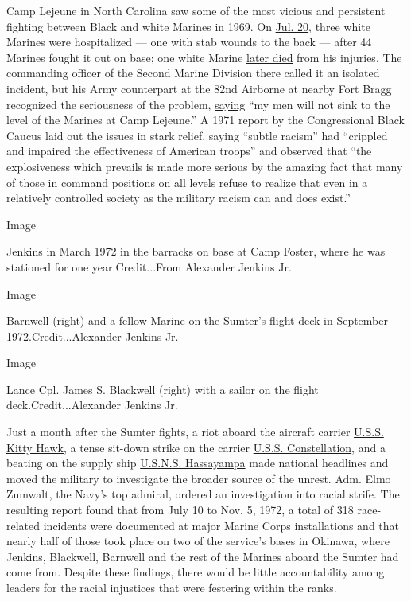 Camp Lejeune in North Carolina saw some of the most vicious and
persistent fighting between Black and white Marines in 1969. On
\href{https://www.nytimes3xbfgragh.onion/1969/07/24/archives/3-marines-hurt-in-lejeune-fight-hospitalized-after-a-racial.html}{Jul.
20}, three white Marines were hospitalized --- one with stab wounds to
the back --- after 44 Marines fought it out on base; one white Marine
\href{https://www.nytimes3xbfgragh.onion/1969/07/28/archives/corporal-20-dies-of-injuries-week-after-marine-base-fight.html}{later
died} from his injuries. The commanding officer of the Second Marine
Division there called it an isolated incident, but his Army counterpart
at the 82nd Airborne at nearby Fort Bragg recognized the seriousness of
the problem,
\href{https://www.nytimes3xbfgragh.onion/1969/08/23/archives/airborne-general-derides-marines-on-racial-fights.html}{saying}
``my men will not sink to the level of the Marines at Camp Lejeune.'' A
1971 report by the Congressional Black Caucus laid out the issues in
stark relief, saying ``subtle racism'' had ``crippled and impaired the
effectiveness of American troops'' and observed that ``the explosiveness
which prevails is made more serious by the amazing fact that many of
those in command positions on all levels refuse to realize that even in
a relatively controlled society as the military racism can and does
exist.''

Image

Jenkins in March 1972 in the barracks on base at Camp Foster, where he
was stationed for one year.Credit...From Alexander Jenkins Jr.

Image

Barnwell (right) and a fellow Marine on the Sumter's flight deck in
September 1972.Credit...Alexander Jenkins Jr.

Image

Lance Cpl. James S. Blackwell (right) with a sailor on the flight
deck.Credit...Alexander Jenkins Jr.

Just a month after the Sumter fights, a riot aboard the aircraft carrier
\href{https://www.nytimes3xbfgragh.onion/1972/11/29/archives/kitty-hawk-back-at-home-port-sailors-describe-racial-conflict.html}{U.S.S.
Kitty Hawk}, a tense sit-down strike on the carrier
\href{https://www.nytimes3xbfgragh.onion/1973/02/18/archives/the-constellation-incident-a-sort-of-mutiny.html}{U.S.S.
Constellation}, and a beating on the supply ship
\href{https://www.nytimes3xbfgragh.onion/1972/11/11/archives/zumwalt-rebukes-top-navy-leaders-on-racial-unrest-chief-berates.html}{U.S.N.S.
Hassayampa} made national headlines and moved the military to
investigate the broader source of the unrest. Adm. Elmo Zumwalt, the
Navy's top admiral, ordered an investigation into racial strife. The
resulting report found that from July 10 to Nov. 5, 1972, a total of 318
race-related incidents were documented at major Marine Corps
installations and that nearly half of those took place on two of the
service's bases in Okinawa, where Jenkins, Blackwell, Barnwell and the
rest of the Marines aboard the Sumter had come from. Despite these
findings, there would be little accountability among leaders for the
racial injustices that were festering within the ranks.

